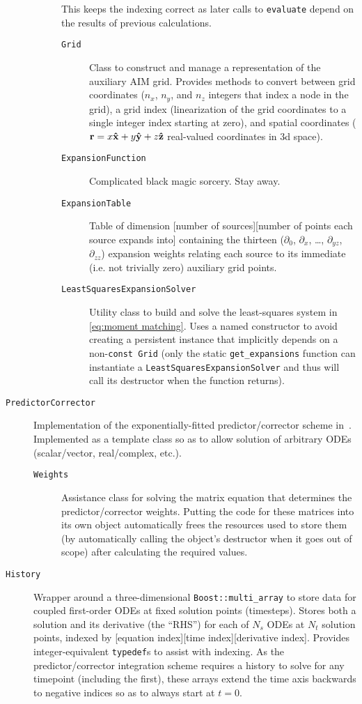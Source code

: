 \begin{description}
\begin{description}
        This keeps the indexing correct as later calls to \lstinline!evaluate! depend on the results of previous calculations.
        \begin{description}
          \item[\texttt{Grid}] Class to construct and manage a representation of the auxiliary AIM grid.
            Provides methods to convert between grid coordinates ($n_x$, $n_y$, and $n_z$ integers that index a node in the grid), a grid index (linearization of the grid coordinates to a single integer index starting at zero), and spatial coordinates ($\vb{r} = x \vu{x} + y \vu{y} + z \vu{z}$ real-valued coordinates in 3d space).
          \item[\texttt{ExpansionFunction}] Complicated black magic sorcery. Stay away.
          \item[\texttt{ExpansionTable}] Table of dimension [number of sources][number of points each source expands into] containing the thirteen ($\partial_0$, $\partial_x$, \ldots, $\partial_{yz}$, $\partial_{zz}$) expansion weights relating each source to its immediate (i.e. not trivially zero) auxiliary grid points.
          \item[\texttt{LeastSquaresExpansionSolver}] Utility class to build and solve the least-squares system in \cref{eq:moment matching}.
            Uses a named constructor to avoid creating a persistent instance that implicitly depends on a non-\lstinline!const Grid! (only the static \lstinline!get_expansions! function can instantiate a \lstinline!LeastSquaresExpansionSolver! and thus will call its destructor when the function returns).
        \end{description}
    \end{description}
  \item[\texttt{PredictorCorrector}] Implementation of the exponentially-fitted predictor/corrector scheme in~\cite{Rokhlin}.
    Implemented as a template class so as to allow solution of arbitrary ODEs (scalar/vector, real/complex, etc.).
    \begin{description}
      \item[\texttt{Weights}] Assistance class for solving the matrix equation that determines the predictor/corrector weights.
        Putting the code for these matrices into its own object automatically frees the resources used to store them (by automatically calling the object's destructor when it goes out of scope) after calculating the required values.
    \end{description}
  \item[\texttt{History}] Wrapper around a three-dimensional \lstinline!Boost::multi_array! to store data for coupled first-order ODEs at fixed solution points (timesteps).
    Stores both a solution and its derivative (the ``RHS'') for each of $N_s$ ODEs at $N_t$ solution points, indexed by [equation index][time index][derivative index].
    Provides integer-equivalent \lstinline!typedef!s to assist with indexing.
    As the predictor/corrector integration scheme requires a history to solve for any timepoint (including the first), these arrays extend the time axis backwards to negative indices so as to always start at $t = 0$.
\end{description}
